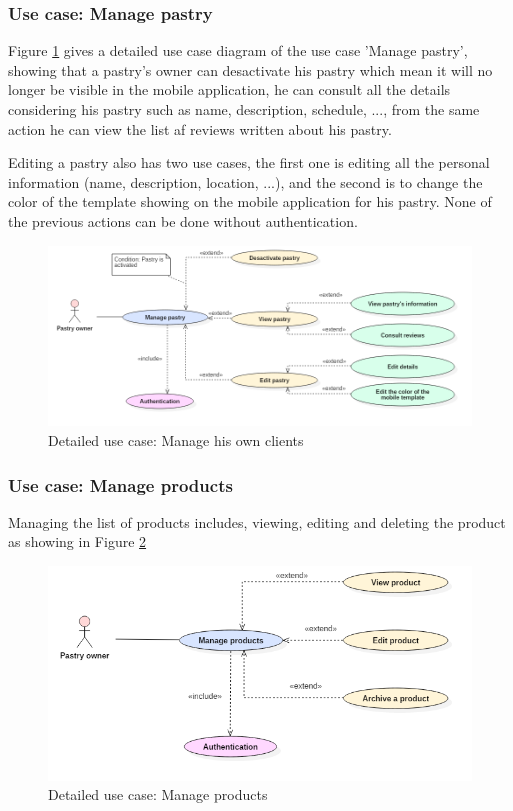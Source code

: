\documentclass[12pt,a4paper]{report}
\begin{document}
	\subsubsection*{Use case: Manage pastry}
	Figure \ref{user-case-manage-pastry} gives a detailed use case diagram of the use case 'Manage pastry', showing that a pastry's owner can desactivate his pastry which mean it will no longer be visible in the mobile application, he can consult all the details considering his pastry such as name, description, schedule, ..., from the same action he can view the list af reviews written about his pastry. 
	\par 
	Editing a pastry also has two use cases, the first one is editing all the personal information (name, description, location, ...), and the second is to change the color of the template showing on the mobile application for his pastry. None of the previous actions can be done without authentication.
	\begin{figure}[H]
		\centering
		\includegraphics[width=7in,keepaspectratio]{usecasemanagepastry.png}
		\caption{Detailed use case: Manage his own clients}
		\label{user-case-manage-pastry}
	\end{figure}

\subsubsection*{Use case: Manage products}
Managing the list of products includes, viewing, editing and deleting the product as showing in Figure \ref{user-case-manage-products}
\begin{figure}[H]
	\centering
	\includegraphics[width=6in,keepaspectratio]{manageproducts.png}
	\caption{Detailed use case: Manage products}
	\label{user-case-manage-products}
\end{figure}
	
\end{document}
